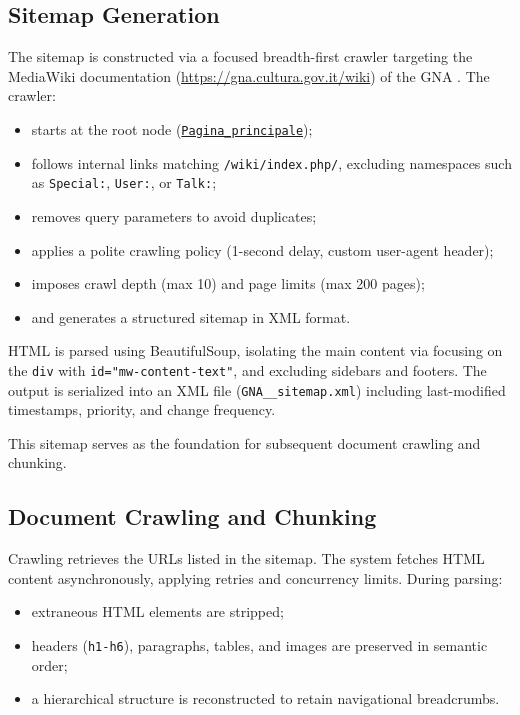 \begin{spacing}{1.5}
\subsection{Sitemap Generation}
The sitemap is constructed via a focused breadth-first crawler targeting the MediaWiki documentation (\url{https://gna.cultura.gov.it/wiki}) of the GNA \citep{mic_mic_2019}. 
The crawler:
\begin{itemize}
      \item starts at the root node (\texttt{\href{https://web.archive.org/web/20250803092155/https://gna.cultura.gov.it/wiki/index.php/Pagina_principale}{Pagina\_principale}}\nocite{noauthor_wiki_2025});
      \item follows internal links matching \texttt{/wiki/index.php/}, excluding namespaces such as \texttt{Special:}, \texttt{User:}, or \texttt{Talk:};
      \item removes query parameters to avoid duplicates;
      \item applies a polite crawling policy (1-second delay, custom user-agent header);
      \item imposes crawl depth (max 10) and page limits (max 200 pages);
      \item and generates a structured sitemap in XML format.
\end{itemize}

HTML is parsed using BeautifulSoup, isolating the main content via focusing on the \texttt{div} with \texttt{id="mw-content-text"}, and excluding sidebars and footers. The output is serialized into an XML file (\texttt{GNA\_\_sitemap.xml}) including last-modified timestamps, priority, and change frequency. 

This sitemap serves as the foundation for subsequent document crawling and chunking.

\subsection{Document Crawling and Chunking}
Crawling retrieves the URLs listed in the sitemap. The system fetches HTML content asynchronously, applying retries and concurrency limits. During parsing:
\begin{itemize}
      \item extraneous HTML elements are stripped;
      \item headers (\texttt{h1-h6}), paragraphs, tables, and images are preserved in semantic order;
      \item a hierarchical structure is reconstructed to retain navigational breadcrumbs.
\end{itemize}
      

\end{spacing}
